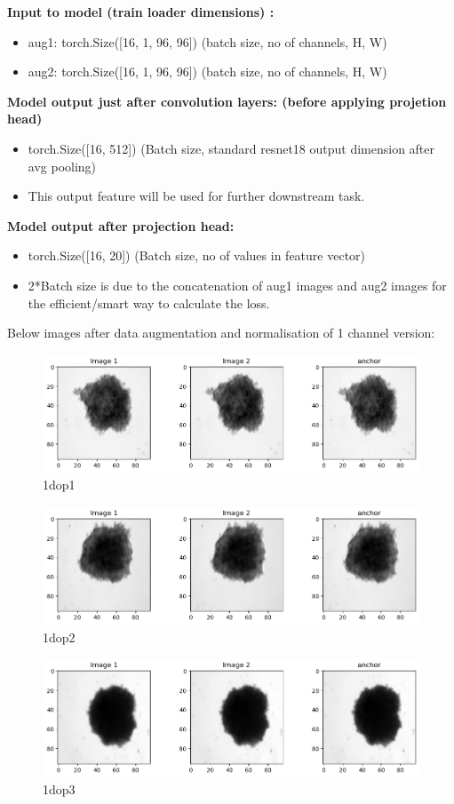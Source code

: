 \documentclass[a4paper,12pt]{report}
\begin{document}
\textbf{Input to model (train loader dimensions) :} 
\begin{itemize}
   \item aug1: torch.Size([16, 1, 96, 96])        (batch size, no of channels, H, W)
   \item aug2: torch.Size([16, 1, 96, 96])        (batch size, no of channels, H, W) \vspace{1em}
\end{itemize}
\textbf{Model output just after convolution layers: (before applying projetion head)} 
\begin{itemize}
  \item torch.Size([16, 512]) (Batch size, standard resnet18 output dimension after avg pooling)   
  \item This output feature will be used for further downstream task.  \vspace{1em}
\end{itemize}

\textbf{Model output after projection head:}
\begin{itemize}
  \item torch.Size([16, 20])  (Batch size, no of values in feature vector)  

  \item 2*Batch size is due to the concatenation of aug1 images and aug2 images for the efficient/smart way to calculate the loss. 
\end{itemize}
Below images after data augmentation and normalisation of 1 channel version:
\begin{figure}[H]
  \centering
  \includegraphics[width=0.9\linewidth]{figures/1dop1.png} %
  \caption{1dop1}
  \label{fig:1doutput1}
\end{figure}

\begin{figure}[H]
  \centering
  \includegraphics[width=0.9\linewidth]{figures/1dop2.png} %
  \caption{1dop2}
  \label{fig:1doutput2}
\end{figure}

\begin{figure}[H]
  \centering
  \includegraphics[width=0.9\linewidth]{figures/1dop3.png} %
  \caption{1dop3}
  \label{fig:1doutput3}
\end{figure}
\end{document}
